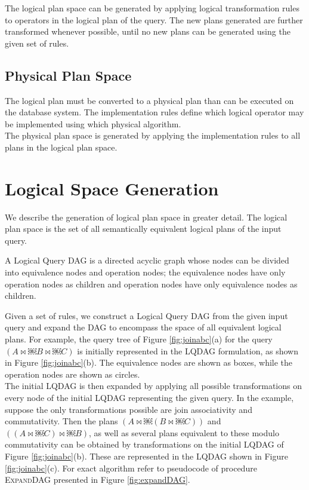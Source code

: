 The logical plan space can be generated by applying logical transformation rules to operators in the logical plan of the query. The new plans generated are further transformed whenever possible, until no new plans can be generated using the given set of rules.

\subsection{Physical Plan Space}
The logical plan must be converted to a physical plan than can be executed on the database system. The implementation rules define which logical operator may be implemented using which physical algorithm. \\

The physical plan space is generated by applying the implementation rules to all plans in the logical plan space.

\section{Logical Space Generation}
We describe the generation of logical plan space in greater detail. The logical plan space is the set of all semantically equivalent logical plans of the input query.

\begin{defn} 
A Logical Query DAG is a directed acyclic graph whose nodes can be divided into equivalence nodes and operation nodes; the equivalence nodes have only operation nodes as children and operation nodes have only equivalence nodes as children. 
\end{defn}

Given a set of rules, we construct a Logical Query DAG from the given input query and expand the DAG to encompass the space of all equivalent logical plans. For example, the query tree of Figure \ref{fig:joinabc}(a) for the query $(A \bowtie￼ B \bowtie￼ C)$ is initially represented in the LQDAG formulation, as shown in Figure \ref{fig:joinabc}(b). The equivalence nodes are shown as boxes, while the operation nodes are shown as circles. \\

The initial LQDAG is then expanded by applying all possible transformations on every node of the initial LQDAG representing the given query. In the example, suppose the only transformations possible are join associativity and commutativity. Then the plans $(A \bowtie￼ (B \bowtie￼ C))$ and $((A \bowtie￼ C) \bowtie￼ B)$, as well as several plans equivalent to these modulo commutativity can be obtained by transformations on the initial LQDAG of Figure \ref{fig:joinabc}(b). These are represented in the LQDAG shown in Figure \ref{fig:joinabc}(c). For exact algorithm refer to pseudocode of procedure \textsc{ExpandDAG} presented in Figure \ref{fig:expandDAG}.

